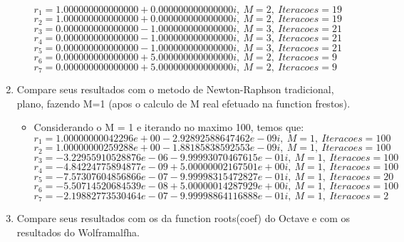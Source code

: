 \documentclass[fleqn]{article}
\begin{document}
\begin{enumerate}
\begin{itemize}
        $r_{1} = 1.000000000000000 + 0.000000000000000i,\ M = 2, \                Iteracoes = 19$\\
        $r_{2} = 1.000000000000000 + 0.000000000000000i,\ M = 2, \              Iteracoes = 19$\\
        $r_{3} = 0.000000000000000 - 1.000000000000000i,\ M = 3, \               Iteracoes = 21$\\
        $r_{4} = 0.000000000000000 - 1.000000000000000i,\ M = 3, \               Iteracoes = 21$\\
        $r_{5} = 0.000000000000000 - 1.000000000000000i,\ M = 3, \              Iteracoes = 21$\\
        $r_{6} = 0.000000000000000 + 5.000000000000000i,\ M = 2, \              Iteracoes = 9$\\
        $r_{7} = 0.000000000000000 + 5.000000000000000i,\ M = 2, \              Iteracoes = 9$\\
   \end{itemize}
   \item Compare seus resultados com o metodo de Newton-Raphson         tradicional, plano, fazendo M=1 (apos o calculo de M real efetuado    na function frestos).
   \begin{itemize}
    \item Considerando o M = 1 e iterando no maximo 100, temos que:\\
        $r_{1} = 1.00000000042296e+00 - 2.92892588647462e-09i,\ M = 1, \                Iteracoes = 100$\\
        $r_{2} = 1.00000000259288e+00 - 1.88185838592553e-09i,\ M = 1, \              Iteracoes = 100$\\
        $r_{3} = -3.22955910528876e-06 - 9.99993070467615e-01i,\ M = 1, \               Iteracoes = 100$\\
        $r_{4} = -4.84224775894877e-09 + 5.00000002167501e+00i,\ M = 1, \               Iteracoes = 100$\\
        $r_{5} =-7.57307604856866e-07 - 9.99998315472827e-01i,\ M = 1, \              Iteracoes = 20$\\
        $r_{6} = -5.50714520684539e-08 + 5.00000014287929e+00i,\ M = 1, \              Iteracoes = 100$\\
        $r_{7} = -2.19882773530464e-07 - 9.99998864116888e-01i,\ M = 1, \              Iteracoes = 2$\\
   \end{itemize}
      \item Compare seus resultados com os da function roots(coef) do Octave e com os resultados do Wolframalfha.

\end{enumerate}
\end{document}
